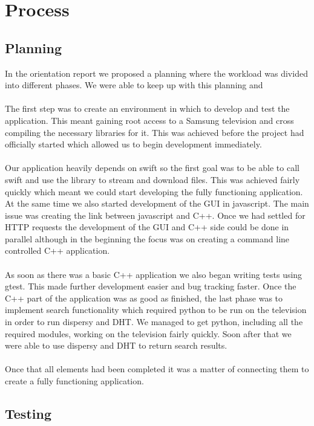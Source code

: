 \chapter{Process}

\section{Planning}

In the orientation report we proposed a planning where the workload was divided into different phases. We were able to keep up with this planning and 
\\\\
The first step was to create an environment in which to develop and test the application. This meant gaining root access to a Samsung television and cross compiling the necessary libraries for it. This was achieved before the project had officially started which allowed us to begin development immediately.
\\\\
Our application heavily depends on swift so the first goal was to be able to call swift and use the library to stream and download files. This was achieved fairly quickly which meant we could start developing the fully functioning application. At the same time we also started development of the GUI in javascript. The main issue was creating the link between javascript and C++. Once we had settled for HTTP requests the development of the GUI and C++ side could be done in parallel although in the beginning the focus was on creating a command line controlled C++ application.
\\\\
As soon as there was a basic C++ application we also began writing tests using gtest. This made further development easier and bug tracking faster. Once the C++ part of the application was as good as finished, the last phase was to implement search functionality which required python to be run on the television in order to run dispersy and DHT. We managed to get python, including all the required modules, working on the television fairly quickly. Soon after that we were able to use dispersy and DHT to return search results.
\\\\
Once that all elements had been completed it was a matter of connecting them to create a fully functioning application.

\section{Testing}

